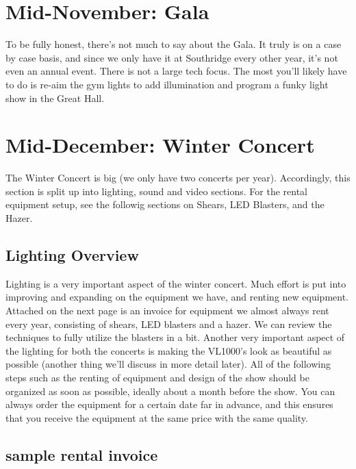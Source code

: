 \documentclass[letterpaper,10pt,oneside,headsepline]{scrreprt}
\begin{document}
\section{Mid-November: Gala}
To be fully honest, there's not much to say about the Gala. It truly is on a case by case basis, and since we only have it at Southridge every other year, it's not even an annual event. There is not a large tech focus. The most you'll likely have to do is re-aim the gym lights to add illumination and program a funky light show in the Great Hall.
\section{Mid-December: Winter Concert}
The Winter Concert is big (we only have two concerts per year). Accordingly, this section is split up into lighting, sound and video sections. For the rental equipment setup, see the followig sections on Shears, LED Blasters, and the Hazer. 

\subsection{Lighting Overview}
Lighting is a very important aspect of the winter concert. Much effort is put into improving and expanding on the equipment we have, and renting new equipment. Attached on the next page is an invoice for equipment we almost always rent every year, consisting of shears, LED blasters and a hazer. We can review the techniques to fully utilize the blasters in a bit. Another very important aspect of the lighting for both the concerts is making the VL1000's look as beautiful as possible (another thing we'll discuss in more detail later). All of the following steps such as the renting of equipment and design of the show should be organized as soon as possible, ideally about a month before the show. You can always order the equipment for a certain date far in advance, and this ensures that you receive the equipment at the same price with the same quality.

\subsection{sample rental invoice}
%

\end{document}
